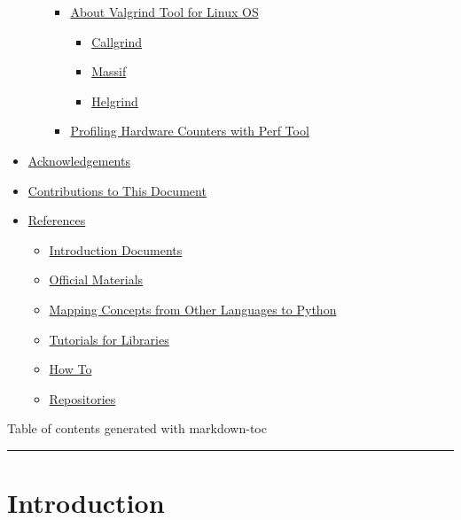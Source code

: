 \documentclass[
]{article}
\begin{document}
\begin{itemize}
\begin{itemize}
    \begin{itemize}
    \item
      \protect\hyperlink{about-valgrind-tool-for-linux-os}{About
      Valgrind Tool for Linux OS}

      \begin{itemize}
      \item
        \protect\hyperlink{callgrind}{Callgrind}
      \item
        \protect\hyperlink{massif}{Massif}
      \item
        \protect\hyperlink{helgrind}{Helgrind}
      \end{itemize}
    \item
      \protect\hyperlink{profiling-hardware-counters-with-perf-tool}{Profiling
      Hardware Counters with Perf Tool}
    \end{itemize}
  \end{itemize}
\item
  \protect\hyperlink{acknowledgements}{Acknowledgements}
\item
  \protect\hyperlink{contributions-to-this-document}{Contributions to
  This Document}
\item
  \protect\hyperlink{references}{References}

  \begin{itemize}
  \item
    \protect\hyperlink{introduction-documents}{Introduction Documents}
  \item
    \protect\hyperlink{official-materials}{Official Materials}
  \item
    \protect\hyperlink{mapping-concepts-from-other-languages-to-python}{Mapping
    Concepts from Other Languages to Python}
  \item
    \protect\hyperlink{tutorials-for-libraries}{Tutorials for Libraries}
  \item
    \protect\hyperlink{how-to}{How To}
  \item
    \protect\hyperlink{repositories}{Repositories}
  \end{itemize}
\end{itemize}

Table of contents generated with markdown-toc

\begin{center}\rule{0.5\linewidth}{0.5pt}\end{center}

\hypertarget{introduction}{%
\section{Introduction}\label{introduction}}
\end{document}
